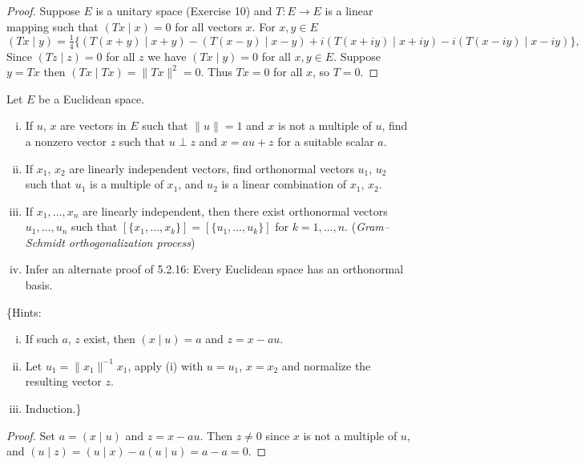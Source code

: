 \begin{proof}
    Suppose $E$ is a unitary space (Exercise 10)
        and $T : E \to E$ is a linear mapping
        such that $(Tx \mid x) = 0$ for all vectors $x$.
    For $x, y \in E$
    \[(Tx \mid y) = \tfrac{1}{4}\{(T(x+y)\mid x+y) - (T(x-y)\mid x-y) + i(T(x+iy)\mid x+iy) - i(T(x-iy)\mid x-iy)\},\]
    Since $(Tz \mid z) = 0$ for all $z$ we have $(Tx \mid y) = 0$ for all $x, y \in E$. 
    Suppose $y = Tx$ then $(Tx \mid Tx) = \|Tx\|^2 = 0$.
    Thus $Tx = 0$ for all $x$, so $T = 0$.
\end{proof}

\begin{tcolorbox}[title=Problem 12, breakable]
Let $E$ be a Euclidean space.
\begin{enumerate}[(i)]
    \item If $u$, $x$ are vectors in $E$ such that $\|u\| = 1$ and $x$ is not a multiple of $u$, find a nonzero vector $z$ such that $u \perp z$ and $x = au + z$ for a suitable scalar $a$.

    \item If $x_1$, $x_2$ are linearly independent vectors, find orthonormal vectors $u_1$, $u_2$ such that $u_1$ is a multiple of $x_1$, and $u_2$ is a linear combination of $x_1$, $x_2$.

    \item If $x_1, \ldots, x_n$ are linearly independent, then there exist orthonormal vectors $u_1, \ldots, u_n$ such that $[\{x_1, \ldots, x_k\}] = [\{u_1, \ldots, u_k\}]$ for $k = 1, \ldots, n$. (\textit{Gram--Schmidt orthogonalization process})

    \item Infer an alternate proof of 5.2.16: Every Euclidean space has an orthonormal basis.
\end{enumerate}
\{Hints:
\begin{enumerate}[(i)]
    \item If such $a$, $z$ exist, then $(x \mid u) = a$ and $z = x - au$.
    \item Let $u_1 = \|x_1\|^{-1}x_1$, apply (i) with $u = u_1$, $x = x_2$ and normalize the resulting vector $z$.
    \item Induction.\}
\end{enumerate}
\end{tcolorbox}

\begin{proof}
    Set $a = (x \mid u)$ and $z = x - au$. 
    Then $z \neq 0$ since $x$ is not a multiple of $u$, 
        and $(u \mid z) = (u \mid x) - a(u \mid u) = a - a = 0$.
\end{proof}

